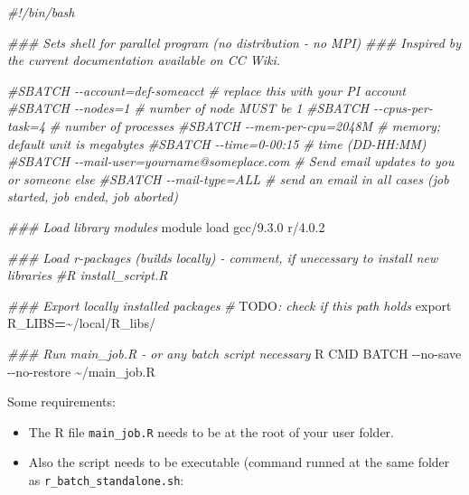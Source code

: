 \documentclass[
]{book}
\newenvironment{Shaded}{\begin{snugshade}}{\end{snugshade}}
\newcommand{\AlertTok}[1]{\textcolor[rgb]{0.94,0.16,0.16}{#1}}
\newcommand{\AttributeTok}[1]{\textcolor[rgb]{0.77,0.63,0.00}{#1}}
\newcommand{\BuiltInTok}[1]{#1}
\newcommand{\CommentTok}[1]{\textcolor[rgb]{0.56,0.35,0.01}{\textit{#1}}}
\newcommand{\ExtensionTok}[1]{#1}
\newcommand{\NormalTok}[1]{#1}
\newcommand{\OperatorTok}[1]{\textcolor[rgb]{0.81,0.36,0.00}{\textbf{#1}}}
\newcommand{\VariableTok}[1]{\textcolor[rgb]{0.00,0.00,0.00}{#1}}
\providecommand{\tightlist}{%
  \setlength{\itemsep}{0pt}\setlength{\parskip}{0pt}}
\begin{document}
\begin{Shaded}
\begin{Highlighting}[]
\CommentTok{\#!/bin/bash}

\CommentTok{\#\#\# Sets shell for parallel program (no distribution {-} no MPI)}
\CommentTok{\#\#\# Inspired by the current documentation available on CC Wiki.}

\CommentTok{\#SBATCH {-}{-}account=def{-}someacct             \# replace this with your PI account}
\CommentTok{\#SBATCH {-}{-}nodes=1                          \# number of node MUST be 1}
\CommentTok{\#SBATCH {-}{-}cpus{-}per{-}task=4                  \# number of processes}
\CommentTok{\#SBATCH {-}{-}mem{-}per{-}cpu=2048M                \# memory; default unit is megabytes}
\CommentTok{\#SBATCH {-}{-}time=0{-}00:15                     \# time (DD{-}HH:MM)}
\CommentTok{\#SBATCH {-}{-}mail{-}user=yourname@someplace.com \# Send email updates to you or someone else}
\CommentTok{\#SBATCH {-}{-}mail{-}type=ALL                    \# send an email in all cases (job started, job ended, job aborted)}

\CommentTok{\#\#\# Load library modules}
\ExtensionTok{module}\NormalTok{ load gcc/9.3.0 r/4.0.2}

\CommentTok{\#\#\# Load r{-}packages (builds locally) {-} comment, if unecessary to install new libraries}
\CommentTok{\#R install\_script.R}

\CommentTok{\#\#\# Export locally installed packages}
\CommentTok{\# }\AlertTok{TODO}\CommentTok{: check if this path holds}
\BuiltInTok{export} \VariableTok{R\_LIBS}\OperatorTok{=}\NormalTok{\textasciitilde{}/local/R\_libs/}

\CommentTok{\#\#\# Run main\_job.R {-} or any batch script necessary}
\ExtensionTok{R}\NormalTok{ CMD BATCH }\AttributeTok{{-}{-}no{-}save} \AttributeTok{{-}{-}no{-}restore}\NormalTok{ \textasciitilde{}/main\_job.R}
\end{Highlighting}
\end{Shaded}

Some requirements:

\begin{itemize}
\tightlist
\item
  The R file \texttt{main\_job.R} needs to be at the root of your user folder.
\item
  Also the script needs to be executable (command runned at the same folder
  as \texttt{r\_batch\_standalone.sh}:
\end{itemize}

\begin{Shaded}
\end{Shaded}
\end{document}
